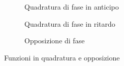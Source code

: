 \begin{figure}
	\begin{subfigure}[b]{0.5\linewidth}
		\centering
		\caption{Quadratura di fase in anticipo}\label{fig:QuadraturaFaseAnticipo}
	\end{subfigure}%
		\qquad\qquad
	\begin{subfigure}[b]{0.5\linewidth}
		\centering
		\caption{Quadratura di fase in ritardo}\label{fig:QuadraturaFaseARitardo}
	\end{subfigure}
	\begin{subfigure}[b]{0.5\linewidth}
			\centering
			\caption{Opposizione di fase}\label{fig:Opposizionedifase}
	\end{subfigure}
	\caption{Funzioni in quadratura e opposizione}%
	\label{fig:Funzioniinquadratura}%
\end{figure}
